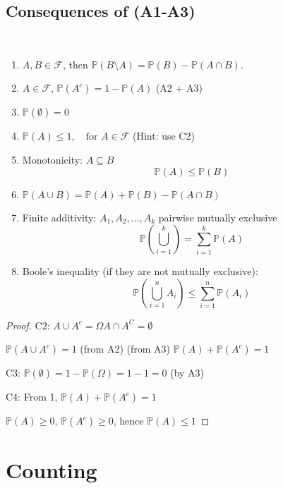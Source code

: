 \documentclass[10pt, a4paper]{article}
\begin{document}
\subsection{Consequences of (A1-A3)}

\begin{proposition} \phantom{} \\
    \begin{enumerate}[label = (C\arabic*)]
        \item $A, B \in \mathcal{F}$, then $\mathbb{P}(B \setminus A) = \mathbb{P}(B) - \mathbb{P}(A \cap B)$.
        \item $A \in \mathcal{F}$, $\mathbb{P}(A ^ c) = 1 - \mathbb{P}(A)$ (A2 + A3)
        \item $\mathbb{P}(\emptyset) = 0$
        \item $\mathbb{P}(A) \leq 1,\quad\text{for } A \in \mathcal{F}$ (Hint: use C2)
        \item Monotonicity: $A \subseteq B$
        \[
        \mathbb{P}(A) \leq \mathbb{P}(B)
        \]
        \item $\mathbb{P}(A \cup B) = \mathbb{P}(A) + \mathbb{P}(B) - \mathbb{P}(A \cap B)$
        \item Finite additivity: $A_1, A_2,\dotsc, A_k$ pairwise mutually exclusive
        \[
        \mathbb{P}\left(\bigcup_{i = 1}^{k}\right) = \sum_{i = 1}^{k}\mathbb{P}(A)
        \]
        \item Boole's inequality (if they are not mutually exclusive):
        \[
        \mathbb{P}\left(\bigcup_{i = 1}^{n}A_i\right) \leq \sum_{i = 1}^{n}\mathbb{P}(A_i)
        \]
    \end{enumerate}
    \begin{proof}
        C2:
        $A \cup A ^ c = \Omega$\quad$A \cap A ^ C = \emptyset$

        $\mathbb{P}(A \cup A ^ c) = 1$ (from A2)
        (from A3)
        $\mathbb{P}(A) + \mathbb{P}(A ^ c) = 1$

        C3:
        $\mathbb{P}(\emptyset) = 1 - \mathbb{P}(\Omega) = 1 - 1 = 0$ (by A3)

        C4:
        From 1, $\mathbb{P}(A) + \mathbb{P}(A ^ c) = 1$
        
        $\mathbb{P}(A) \geq 0,\,\mathbb{P}(A ^ c) \geq 0$, hence $\mathbb{P}(A) \leq 1$
    \end{proof}
\end{proposition}

\section{Counting}
\end{document}
